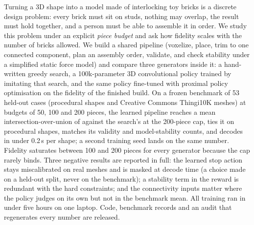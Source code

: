 Turning a 3D shape into a model made of interlocking toy bricks is a discrete design problem: every brick must sit on
studs, nothing may overlap, the result must hold together, and a person must be able to assemble it in order. We study
this problem under an explicit \emph{piece budget} and ask how fidelity scales with the number of bricks allowed. We
build a shared pipeline (voxelize, place, trim to one connected component, plan an assembly order, validate, and check
stability under a simplified static force model) and compare three generators inside it: a hand-written greedy search,
a 100k-parameter 3D convolutional policy trained by imitating that search, and the same policy fine-tuned with proximal
policy optimisation on the fidelity of the finished build. On a frozen benchmark of 53 held-out cases (procedural
shapes and Creative Commons Thingi10K meshes) at budgets of 50, 100 and 200 pieces, the learned pipeline reaches a mean
intersection-over-union of \meanRlVTwoNostopTwoHundred{} against the search's \meanGreedyVOneTwoHundred{} at the 200-piece cap, ties it on
procedural shapes, matches its validity and model-stability counts, and decodes in under 0.2\,s per shape; a second
training seed lands on the same number. Fidelity saturates between 100 and 200 pieces for every generator because
the cap rarely binds. Three negative results are reported in full: the learned stop action stays miscalibrated on
real meshes and is masked at decode time (a choice made on a held-out split, never on the benchmark); a stability term
in the reward is redundant with the hard constraints; and the connectivity inputs matter where the policy judges on
its own but not in the benchmark mean. All training ran in under five hours on one laptop. Code, benchmark records
and an audit that regenerates every number are released.
